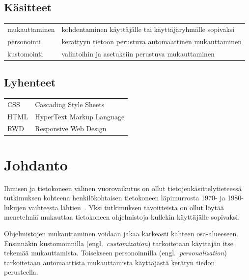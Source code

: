 \documentclass[finnish, 12pt, a4paper, elec, utf8, a-1b, online]{aaltothesis}
\date{xx.xx.2022}
\begin{document}
\makecoverpage{}

\makecopyrightpage{}

\begin{abstractpage}[finnish]
\end{abstractpage}

\thesistableofcontents{}


\subsection*{Käsitteet}

\begin{tabular}{ll}
mukauttaminen & kohdentaminen käyttäjälle tai käyttäjäryhmälle sopivaksi \\
personointi & kerättyyn tietoon perustuva automaattinen mukauttaminen \\
kustomointi & valintoihin ja asetuksiin perustuva mukauttaminen
\end{tabular}

\subsection*{Lyhenteet}

\begin{tabular}{ll}
CSS & Cascading Style Sheets \\
HTML & HyperText Markup Language \\
RWD & Responsive Web Design
\end{tabular}

\cleardoublepage{}

\section{Johdanto}

Ihmisen ja tietokoneen välinen vuorovaikutus on ollut tietojenkäsittelytieteessä
tutkimuksen kohteena henkilökohtaisen tietokoneen läpimurrosta 1970- ja
1980-lukujen vaihteesta lähtien~\cite{10.1145/800178.810088}. Yksi tutkimuksen
tavoitteista on ollut löytää menetelmiä mukauttaa tietokoneen ohjelmistoja
kullekin käyttäjälle sopivaksi.

Ohjelmistojen mukauttaminen voidaan jakaa karkeasti kahteen osa-alueeseen.
Ensinnäkin kustomoinnilla (engl.\ \textit{customization}) tarkoitetaan käyttäjän
itse tekemää mukauttamista. Toisekseen personoinnilla (engl.\
\textit{personalization}) tarkoitetaan automaattista mukauttamista käyttäjästä
kerätyn tiedon perusteella.~\cite{10.1108/03090560710737534}
\end{document}
